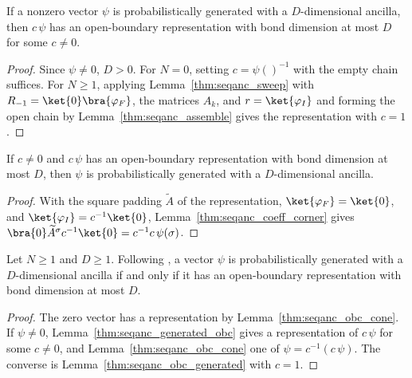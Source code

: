 \begin{lemma}
    \label{thm:seqanc_generated_obc}
    \leanok
    If a nonzero vector $\psi$ is probabilistically generated with a
    $D$-dimensional ancilla, then $c\,\psi$ has an open-boundary
    representation with bond dimension at most $D$ for some $c\ne 0$.
\end{lemma}
\begin{proof}
    \leanok
    Since $\psi\ne 0$, $D>0$. For $N=0$, setting $c=\psi()^{-1}$ with the empty
    chain suffices. For $N\ge 1$, applying Lemma~\ref{thm:seqanc_sweep} with
    $R_{-1}=\ket{0}\bra{\varphi_F}$, the matrices $A_k$, and
    $r=\ket{\varphi_I}$ and forming the open chain by
    Lemma~\ref{thm:seqanc_assemble} gives the representation with $c=1$.
\end{proof}

\begin{lemma}
    \label{thm:seqanc_obc_generated}
    \leanok
    If $c\ne 0$ and $c\,\psi$ has an open-boundary representation with bond
    dimension at most $D$, then $\psi$ is probabilistically generated with a
    $D$-dimensional ancilla.
\end{lemma}
\begin{proof}
    \leanok
    With the square padding $\widetilde A$ of the representation,
    $\ket{\varphi_F}=\ket{0}$, and $\ket{\varphi_I}=c^{-1}\ket{0}$,
    Lemma~\ref{thm:seqanc_coeff_corner} gives
    $\bra{0}\widetilde A^\sigma c^{-1}\ket{0}=c^{-1}c\,\psi(\sigma)$.
\end{proof}

\begin{theorem}
    \label{thm:seqanc_probabilistic}
    \leanok
    Let $N\ge 1$ and $D\ge 1$. Following \cite[Section~5,
        Theorem ``Sequential generation with ancilla'']{PerezGarcia2007Matrix}, a vector $\psi$ is probabilistically generated
    with a $D$-dimensional ancilla if and only if it has an open-boundary
    representation with bond dimension at most $D$.
\end{theorem}
\begin{proof}
    \leanok
    The zero vector has a representation by Lemma~\ref{thm:seqanc_obc_cone}.
    If $\psi\ne 0$, Lemma~\ref{thm:seqanc_generated_obc} gives a
    representation of $c\,\psi$ for some $c\ne 0$, and
    Lemma~\ref{thm:seqanc_obc_cone} one of $\psi=c^{-1}(c\,\psi)$. The
    converse is Lemma~\ref{thm:seqanc_obc_generated} with $c=1$.
\end{proof}

